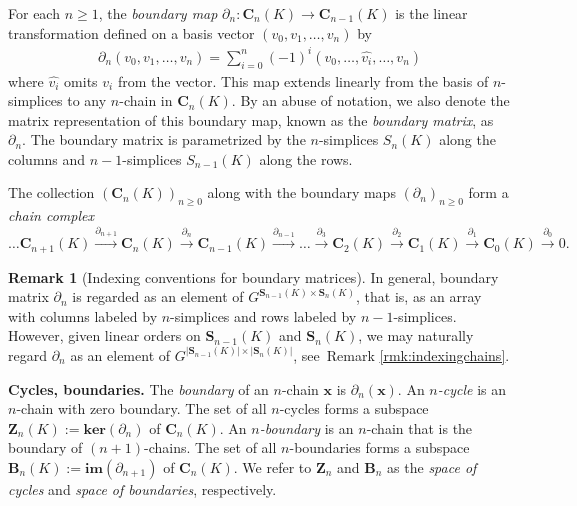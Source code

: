 \documentclass[11pt,onecolumn]{article}
\newcommand{\Chains}{\mathbf{C}}
\newcommand{\Boundaries}[0]{\mathbf{B}}
\newcommand{\Simplices}[0]{\mathbf{S}}
\newcommand{\Cycles}[0]{\mathbf{Z}}
\newcommand{\optimalrep}{\mathbf{x}}
\theoremstyle{plain}
\theoremstyle{definition}
\newtheorem{remark}[theorem]{Remark}
\begin{document}
  

For each $n\geq 1$, the \textit{boundary map} $\partial_n: \Chains_n(K) \rightarrow \Chains_{n-1}(K)$ is the linear transformation defined on a basis vector  $(v_0, v_1, \ldots, v_n)$ by 
    \begin{align*}
    \textstyle
        \partial_n(v_0, v_1, \ldots, v_n) = \sum_{i=0}^n (-1)^i (v_0, \ldots, \hat{v_i}, \ldots, v_n)
    \end{align*}
where $\hat{v_i}$ omits $v_i$ from the vector. This map extends linearly from the basis of $n$-simplices to any $n$-chain in $\Chains_n(K)$. By an abuse of notation, we also denote the matrix representation of this boundary map, known as the \textit{boundary matrix}, as $\partial_n$. The boundary matrix is parametrized by the $n$-simplices $S_n(K)$ along the columns and $n-1$-simplices $S_{n-1}(K)$ along the rows. 


 
The collection  $(\Chains_n(K))_{n\geq 0}$ along with the boundary maps $(\partial_n)_{n\geq 0}$ form a \textit{chain complex}
\[\ldots \Chains_{n+1}(K) \xrightarrow{\partial_{n+1}} \Chains_{n}(K) \xrightarrow{\partial_{n}} \Chains_{n-1}(K) \xrightarrow{\partial_{n-1}} \ldots \xrightarrow{\partial_3} \Chains_2(K) \xrightarrow{\partial_2} \Chains_1(K) \xrightarrow{\partial_1} \Chains_0(K) \xrightarrow{\partial_0} 0. \]
 
\begin{remark}[{Indexing conventions for boundary matrices}]
\label{rmk:boundarymatrixindexing}
In general, boundary matrix $\partial_n$ is regarded as an element of $G^{\Simplices_{n-1}(K) \times \Simplices_{n}(K)}$, that is, as an array with columns labeled by $n$-simplices and rows labeled by $n-1$-simplices.  However, given linear orders on  $\Simplices_{n-1}(K)$ and $\Simplices_{n}(K)$, we may naturally regard $\partial_n$ as an element of $G^{|\Simplices_{n-1}(K)| \times |\Simplices_{n}(K)|}$, see\ Remark \ref{rmk:indexingchains}. 
\end{remark} 


\noindent \textbf{Cycles, boundaries.}  The \emph{boundary} of an $n$-chain $\optimalrep$ is  $\partial_n (\optimalrep)$.
An \textit{$n$-cycle} is an $n$-chain with zero boundary. The set of all $n$-cycles forms a subspace $\Cycles_n(K) := \textbf{ker}(\partial_n)$ of $\Chains_n(K).$ An \textit{$n$-boundary} is an $n$-chain that is the boundary of $(n+1)$-chains. The set of all $n$-boundaries forms a subspace $\Boundaries_n(K):= \textbf{im}(\partial_{n+1})$ of $\Chains_n(K).$   We refer to $\Cycles_n$ and $\Boundaries_n$ as the \emph{space of cycles} and \emph{space of boundaries}, respectively.
\end{document}
